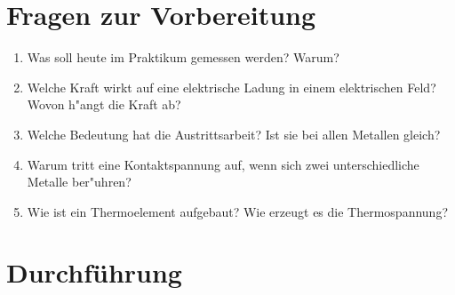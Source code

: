 
\section{Fragen zur Vorbereitung}

\begin{enumerate}
 \item Was soll heute im Praktikum gemessen werden? Warum?
 \item Welche Kraft wirkt auf eine elektrische Ladung in einem elektrischen Feld? Wovon h"angt die Kraft ab?
 \item Welche Bedeutung hat die Austrittsarbeit? Ist sie bei allen Metallen gleich?
 \item Warum tritt eine Kontaktspannung auf, wenn sich zwei unterschiedliche Metalle ber"uhren?
 \item Wie ist ein Thermoelement aufgebaut? Wie erzeugt es die Thermospannung?
\end{enumerate}

\section{Durchführung} 

